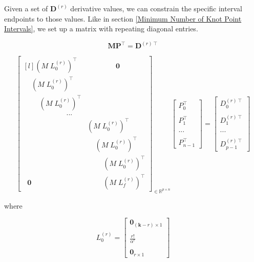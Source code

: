 \documentclass{article}
\begin{document}
Given a set of \(\textbf{D}^{(r)}\) derivative values, we can constrain the specific interval endpoints to those values. Like in section \ref{Minimum Number of Knot Point Intervals}, we set up a matrix with repeating diagonal entries.

\begin{equation}
    \textbf{M}  \textbf{P}^{\intercal} = \textbf{D}^{(r) \intercal}
\end{equation}

\begin{equation} \label{Point_Derivative_Constraints}
    \begin{bmatrix*}[l] (M \; L_0^{(r)})^{\intercal} & \qquad \qquad \textbf{0} \\
    \;\; \;\; (M \; L_0^{(r)})^{\intercal} & \\
    \;\; \;\; \;\; \;\; (M \; L_0^{(r)})^{\intercal} & \\
    \qquad \qquad \qquad ... & \\
     & (M \; L_0^{(r)})^{\intercal} \;\; \;\; \;\; \;\; \\
     & \;\;\;\; (M \; L_0^{(r)})^{\intercal} \;\; \;\; \\
     & \;\;\;\;\;\;\;\; (M \; L_0^{(r)})^{\intercal} \\
    \;\; \textbf{0} & \;\;\;\;\;\;\;\; (M \; L_f^{(r)})^{\intercal}
    \end{bmatrix*}_{\in \mathbb{R}^{p \times n}} 
    \begin{bmatrix}
        P_0^{\intercal} \\\\ P_1^\intercal \\\\ ... \\\\ P_{n-1}^\intercal
    \end{bmatrix} = 
    \begin{bmatrix} D_0^{(r)\intercal} \\\\ D_1^{(r)\intercal}  \\\\ ... \\\\ D_{p-1}^{(r)\intercal} \end{bmatrix}
\end{equation}

where 

\begin{equation}
L_0^{(r)} = \begin{bmatrix} \textbf{0}_{(\textbf{k}-r) \times 1} \\ \\ \frac{r!}{\alpha^r} \\ \\ \textbf{0}_{r \times 1} \end{bmatrix}
\end{equation}
\end{document}
